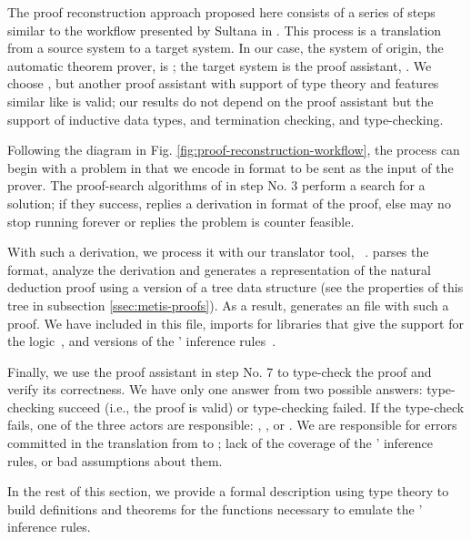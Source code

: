 \documentclass[../main.tex]{subfiles}
\begin{document}
The proof reconstruction approach proposed here consists of a series 
of steps similar to the workflow presented by Sultana in
\cite{sultana2015}. This process is a translation from a source 
system to a target system. In our case, the system of origin, the 
automatic theorem prover, is \Metis; the target system is the proof 
assistant, \Agda. We choose \Agda, but another proof assistant with 
support of type theory and features similar like \Agda is valid; our 
results do not depend on the proof assistant but the support of inductive data types, and termination checking, and type-checking.

Following the diagram in Fig.
\ref{fig:proof-reconstruction-workflow}, the process can begin with 
a problem in \CPL that we encode in \TPTP format to be sent as the 
input of the \Metis prover.
The proof-search algorithms of \Metis in step No. 3 perform a 
search for a solution; if they success, \Metis 
replies a derivation in \TSTP format of the proof, else \Metis may 
no stop running forever or replies the problem is counter feasible.

With such a derivation, we process it with our \Haskell translator 
tool, \Athena~\cite{Athena}.
\Athena parses the \TSTP format, analyze the 
derivation and generates a representation of the natural deduction 
proof using a version of a tree data structure (see the properties 
of this tree in subsection \ref{ssec:metis-proofs}). As a result,
\Athena generates an \Agda file with such a proof. We have included 
in this file, imports for \Agda libraries that give the support for 
the logic~\cite{AgdaProp}, and versions of the \Metis' inference 
rules~\cite{AgdaMetis}. 

Finally, we use the proof assistant in step No. 7 to type-check the 
proof and verify its correctness. We have only one answer from two 
possible answers: type-checking succeed (i.e., the proof is 
valid) or type-checking failed.
If the type-check fails, one of the three actors are 
responsible: \Metis, \Athena, or \Agda. We are responsible for 
errors committed in the translation from \TSTP to \Agda; lack of the 
coverage of the \Metis' inference rules, or bad assumptions about 
them.

In the rest of this section, we provide a formal description using 
type theory to build definitions and theorems for the functions 
necessary to emulate the \Metis' inference rules. 
\end{document}
